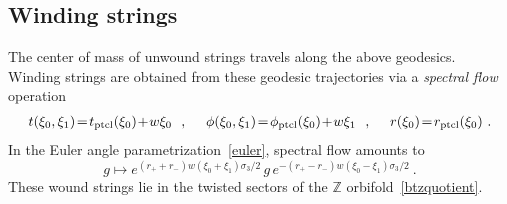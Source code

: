 \documentclass[11pt]{article}
\newcommand{\rcite}{\cite}
\def\ptcl{{\rm ptcl}}
\def\tight#1{\! #1 \!}  %
\def\be{\begin{equation}}
\def\ee{\end{equation}}
\newcommand{\bZ}{{\mathbb Z}}
\numberwithin{equation}{section}
\begin{document}

\subsection{Winding strings}
\label{sec:winding}

The center of mass of unwound strings travels along the above geodesics.  Winding strings are obtained from these geodesic trajectories via a {\it spectral flow} operation~\rcite{Maldacena:2000hw,Hemming:2001we,Troost:2002wk,Ashok:2021ffx,Nippanikar:2021skr}
\begin{align}
\begin{split}
\label{specflow}
t(\xi_0,\xi_1) \tight= t_{\ptcl}(\xi_0)\tight+w\xi_0
~~,~~~~
\phi(\xi_0,\xi_1) \tight= \phi_{\ptcl}(\xi_0)\tight+w\xi_1
~~,~~~~
r(\xi_0) \tight= r_{\ptcl}(\xi_0)  ~.
\end{split}
\end{align}
In the Euler angle parametrization~\eqref{euler}, spectral flow amounts to
\be
g \mapsto e^{(r_++r_-)w(\xi_0+\xi_1)\sigma_3/2} \, g \, e^{-(r_+-r_-)w(\xi_0-\xi_1)\sigma_3/2}  ~.
\ee
These wound strings lie in the twisted sectors of the $\bZ$ orbifold~\eqref{btzquotient}.
\end{document}
